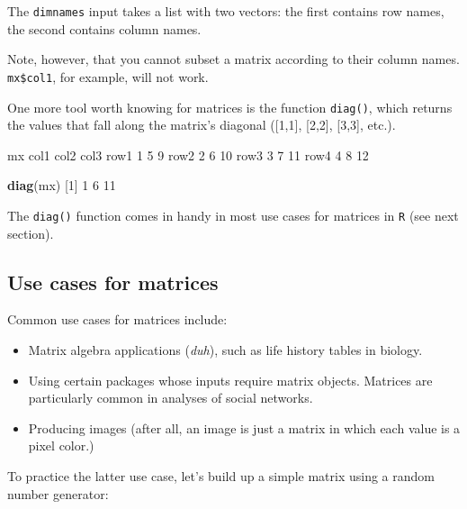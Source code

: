 \documentclass[
]{book}
\newenvironment{Shaded}{\begin{snugshade}}{\end{snugshade}}
\newcommand{\DecValTok}[1]{\textcolor[rgb]{0.00,0.00,0.81}{#1}}
\newcommand{\KeywordTok}[1]{\textcolor[rgb]{0.13,0.29,0.53}{\textbf{#1}}}
\newcommand{\NormalTok}[1]{#1}
\begin{document}
The \texttt{dimnames} input takes a list with two vectors: the first contains row names, the second contains column names.

Note, however, that you cannot subset a matrix according to their column names. \texttt{mx\$col1}, for example, will not work.

One more tool worth knowing for matrices is the function \texttt{diag()}, which returns the values that fall along the matrix's diagonal ({[}1,1{]}, {[}2,2{]}, {[}3,3{]}, etc.).

\begin{Shaded}
\begin{Highlighting}[]
\NormalTok{mx}
\NormalTok{     col1 col2 col3}
\NormalTok{row1    }\DecValTok{1}    \DecValTok{5}    \DecValTok{9}
\NormalTok{row2    }\DecValTok{2}    \DecValTok{6}   \DecValTok{10}
\NormalTok{row3    }\DecValTok{3}    \DecValTok{7}   \DecValTok{11}
\NormalTok{row4    }\DecValTok{4}    \DecValTok{8}   \DecValTok{12}

\KeywordTok{diag}\NormalTok{(mx)}
\NormalTok{[}\DecValTok{1}\NormalTok{]  }\DecValTok{1}  \DecValTok{6} \DecValTok{11}
\end{Highlighting}
\end{Shaded}

The \texttt{diag()} function comes in handy in most use cases for matrices in \texttt{R} (see next section).

\hypertarget{use-cases-for-matrices}{%
\subsection*{Use cases for matrices}\label{use-cases-for-matrices}}

Common use cases for matrices include:

\begin{itemize}
\item
  Matrix algebra applications (\emph{duh}), such as life history tables in biology.
\item
  Using certain packages whose inputs require matrix objects. Matrices are particularly common in analyses of social networks.
\item
  Producing images (after all, an image is just a matrix in which each value is a pixel color.)
\end{itemize}

To practice the latter use case, let's build up a simple matrix using a random number generator:
\end{document}
